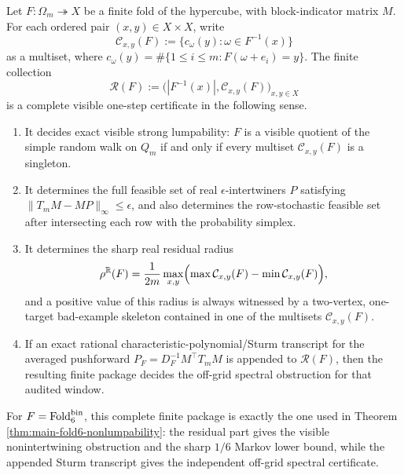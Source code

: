 \begin{theorem}\label{thm:finite-residual-package-complete-visible-certificates}
Let \(F:\Omega_m\twoheadrightarrow X\) be a finite fold of the hypercube, with block-indicator matrix \(M\).  For each ordered pair \((x,y)\in X\times X\), write
\[
\mathcal C_{x,y}(F):=\bigl\{c_\omega(y):\omega\in F^{-1}(x)\bigr\}
\]
as a multiset, where
\(
c_\omega(y)=\#\{1\le i\le m:F(\omega+e_i)=y\}
\).
The finite collection
\[
\mathcal R(F):=\bigl(|F^{-1}(x)|,\mathcal C_{x,y}(F)\bigr)_{x,y\in X}
\]
is a complete visible one-step certificate in the following sense.
\begin{enumerate}[label=\textup{(\roman*)}]
\item It decides exact visible strong lumpability: \(F\) is a visible quotient of the simple random walk on \(Q_m\) if and only if every multiset \(\mathcal C_{x,y}(F)\) is a singleton.
\item It determines the full feasible set of real \(\epsilon\)-intertwiners \(P\) satisfying \(\|T_mM-MP\|_\infty\le\epsilon\), and also determines the row-stochastic feasible set after intersecting each row with the probability simplex.
\item It determines the sharp real residual radius
\[
\rho^{\mathbb{R}}(F)=\frac{1}{2m}\max_{x,y}\Bigl(\max\mathcal C_{x,y}(F)-\min\mathcal C_{x,y}(F)\Bigr),
\]
and a positive value of this radius is always witnessed by a two-vertex, one-target bad-example skeleton contained in one of the multisets \(\mathcal C_{x,y}(F)\).
\item If an exact rational characteristic-polynomial/Sturm transcript for the averaged pushforward \(P_F=D_F^{-1}M^\top T_mM\) is appended to \(\mathcal R(F)\), then the resulting finite package decides the off-grid spectral obstruction for that audited window.
\end{enumerate}
For \(F=\operatorname{Fold}_6^{\mathrm{bin}}\), this complete finite package is exactly the one used in Theorem \ref{thm:main-fold6-nonlumpability}: the residual part gives the visible nonintertwining obstruction and the sharp \(1/6\) Markov lower bound, while the appended Sturm transcript gives the independent off-grid spectral certificate.
\end{theorem}

